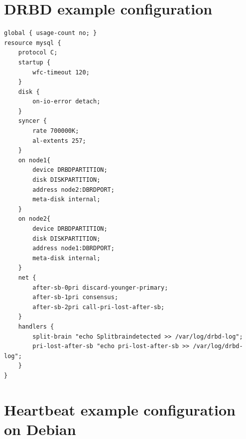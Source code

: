 \documentclass[a4paper,10pt]{report}
\begin{document}
\chapter{DRBD example configuration}
\label{drbdexample}
\begin{lstlisting}
global { usage-count no; }
resource mysql {
	protocol C;
	startup {
		wfc-timeout 120;
	}
	disk {
		on-io-error detach;
	}
	syncer {
		rate 700000K;
		al-extents 257;
	}
	on node1{
		device DRBDPARTITION;
		disk DISKPARTITION;
		address node2:DBRDPORT;
		meta-disk internal;
	}
	on node2{
		device DRBDPARTITION;
		disk DISKPARTITION;
		address node1:DBRDPORT;
		meta-disk internal;
	}
	net {
		after-sb-0pri discard-younger-primary;
		after-sb-1pri consensus;
 		after-sb-2pri call-pri-lost-after-sb;
	}
	handlers {
		split-brain "echo Splitbraindetected >> /var/log/drbd-log";
		pri-lost-after-sb "echo pri-lost-after-sb >> /var/log/drbd-log";
	}
}
\end{lstlisting}





\chapter{Heartbeat example configuration on Debian}
\label{cibexample}
\end{document}
